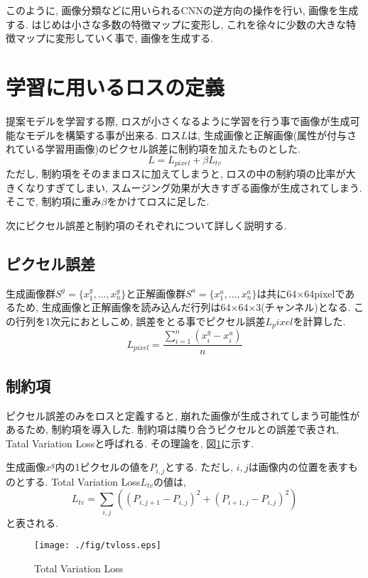  このように, 画像分類などに用いられるCNNの逆方向の操作を行い, 画像を生成する. はじめは小さな多数の特徴マップに変形し, これを徐々に少数の大きな特徴マップに変形していく事で, 画像を生成する. 

\section{学習に用いるロスの定義}
提案モデルを学習する際, ロスが小さくなるように学習を行う事で画像が生成可能なモデルを構築する事が出来る. ロス$L$は, 生成画像と正解画像(属性が付与されている学習用画像)のピクセル誤差に制約項を加えたものとした. 
\begin{equation}
  L = L_{pixel} + \beta L_{tv}
\end{equation}
ただし, 制約項をそのままロスに加えてしまうと, ロスの中の制約項の比率が大きくなりすぎてしまい, スムージング効果が大きすぎる画像が生成されてしまう. そこで, 制約項に重み$\beta$をかけてロスに足した. 

次にピクセル誤差と制約項のそれぞれについて詳しく説明する.
\subsection{ピクセル誤差}
生成画像群$S^g = \{x^g_{1}, ..., x^g_{n}\}$と正解画像群$S^a = \{x^a_{1}, ..., x^a_{n}\}$は共に64×64pixelであるため, 生成画像と正解画像を読み込んだ行列は64×64×3(チャンネル)となる. この行列を1次元におとしこめ, 誤差をとる事でピクセル誤差$L_pixel$を計算した. 
\begin{equation}
  L_{pixel} = \frac{\sum^{n}_{i=1}(x^g_{i} - x^a_{i})}{n}
\end{equation}
\subsection{制約項}
ピクセル誤差のみをロスと定義すると, 崩れた画像が生成されてしまう可能性があるため, 制約項を導入した. 制約項は隣り合うピクセルとの誤差で表され, Tatal Variation Lossと呼ばれる. その理論を, 図\ref{fig:tvloss}に示す. 

生成画像$x^g$内の1ピクセルの値を$P_{i,j}$とする. ただし, $i, j$は画像内の位置を表すものとする. Total Variation Loss$L_{tv}$の値は, 
\begin{equation}
  L_{tv} = \sum_{i,j}((P_{i,j+1} - P_{i,j})^2 + (P_{i+1,j} - P_{i,j})^2)
\end{equation}
と表される. 

\begin{figure}[H]
 	\begin{center}
 		\texttt{[image: ./fig/tvloss.eps]}
 		\caption{Total Variation Loss}
 		\label{fig:tvloss}
 	\end{center}
 \end{figure}

